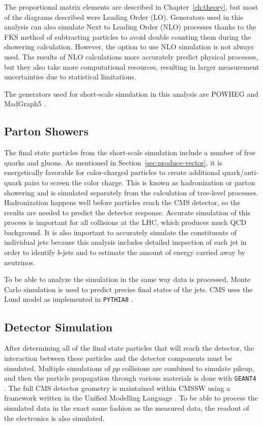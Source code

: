 The proportional matrix elements are described in Chapter~\ref{ch:theory},
but most of the diagrams described were Leading Order (LO).
Generators used in this analysis can also simulate Next to Leading Order (NLO) processes
thanks to the FKS method of subtracting particles to avoid double counting them during the
showering calculation.
However, the option to use NLO simulation is not always used.
The results of NLO calculations more accurately predict physical processes,
but they also take more computational resources,
resulting in larger measurement uncertainties due to statistical limitations.

The generators used for short-scale simulation in this analysis
are POWHEG \cite{Oleari_2010} and MadGraph5 \cite{hirschi2015automated}.

\subsection{Parton Showers}

The final state particles from the short-scale simulation
include a number of free quarks and gluons.
As mentioned in Section~\ref{sec:produce-vector},
it is energetically favorable for color-charged particles to create additional
quark/anti-quark pairs to screen the color charge.
This is known as hadronization or parton showering and
is simulated separately from the calculation of tree-level processes.
Hadronization happens well before particles reach the CMS detector,
so the results are needed to predict the detector response.
Accurate simulation of this process is important for all collisions at the LHC,
which produces much QCD background.
It is also important to accurately simulate the constituents of individual jets
because this analysis includes detailed inspection of each jet
in order to identify $b$-jets and to estimate the amount of energy carried away by neutrinos.

To be able to analyze the simulation in the same way data is processed,
Monte Carlo simulation is used to predict precise final states of the jets.
CMS uses the Lund model \cite{ANDERSSON198331} as implemented in
\texttt{PYTHIA8} \cite{SJOSTRAND2015159}.

\subsection{Detector Simulation}

After determining all of the final state particles that will reach the detector,
the interaction between these particles and the detector components must be simulated.
Multiple simulations of $pp$ collisions are combined to simulate pileup,
and then the particle propagation through various materials is done with
\texttt{GEANT4} \cite{AGOSTINELLI2003250}.
The full CMS detector geometry is maintained within CMSSW \cite{Hildreth_2015}
using a framework written in the Unified Modelling Language \cite{Lefebure:687188}.
To be able to process the simulated data in the exact same fashion as the measured data,
the readout of the electronics is also simulated.

